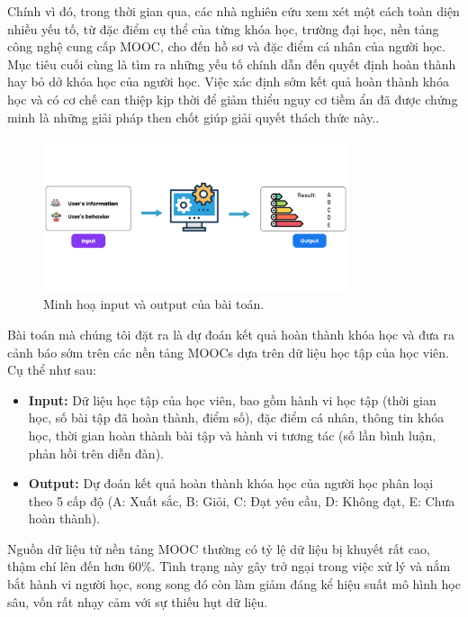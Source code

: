 Chính vì đó, trong thời gian qua, các nhà nghiên cứu xem xét một cách toàn diện nhiều yếu tố, từ đặc điểm cụ thể của từng khóa học, trường đại học, nền tảng công nghệ cung cấp MOOC, cho đến hồ sơ và đặc điểm cá nhân của người học. Mục tiêu cuối cùng là tìm ra những yếu tố chính dẫn đến quyết định hoàn thành hay bỏ dở khóa học của người học. Việc xác định sớm kết quả hoàn thành khóa học và có cơ chế can thiệp kịp thời để giảm thiểu nguy cơ tiềm ẩn đã được chứng minh là những giải pháp then chốt giúp giải quyết thách thức này.\cite{baneres2023early, andres2018studying}.
\begin{figure}[H]
    \centering
    \includegraphics[width = 0.8\textwidth]{imgs/input-output.png}
    \caption{Minh hoạ input và output của bài toán.}
    \label{fig:input_output}
\end{figure}

Bài toán mà chúng tôi đặt ra là dự đoán kết quả hoàn thành khóa học và đưa ra cảnh báo sớm trên các nền tảng MOOCs dựa trên dữ liệu học tập của học viên. Cụ thể như sau:

\begin{itemize}
    \item \textbf{Input:} Dữ liệu học tập của học viên, bao gồm hành vi học tập (thời gian học, số bài tập đã hoàn thành, điểm số), đặc điểm cá nhân, thông tin khóa học, thời gian hoàn thành bài tập và hành vi tương tác (số lần bình luận, phản hồi trên diễn đàn).

    \item \textbf{Output:} Dự đoán kết quả hoàn thành khóa học của người học phân loại theo 5 cấp độ (A: Xuất sắc, B: Giỏi, C: Đạt yêu cầu, D: Không đạt, E: Chưa hoàn thành).
\end{itemize}
Nguồn dữ liệu từ nền tảng MOOC thường có tỷ lệ dữ liệu bị khuyết rất cao, thậm chí lên đến hơn 60\%. Tình trạng này gây trở ngại trong việc xử lý và nắm bắt hành vi người học, song song đó còn làm giảm đáng kể hiệu suất mô hình học sâu, vốn rất nhạy cảm với sự thiếu hụt dữ liệu.

